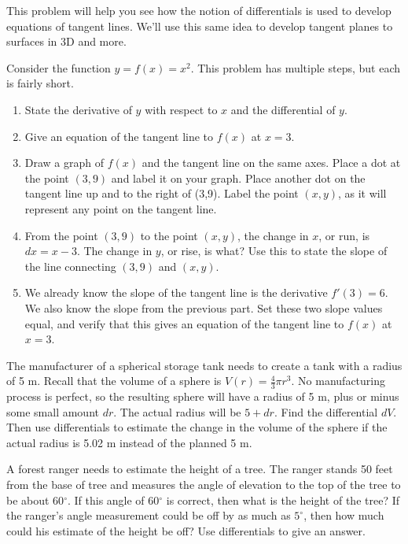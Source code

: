 This problem will help you see how the notion of differentials is used to develop equations of tangent lines. We'll use this same idea to develop tangent planes to surfaces in 3D and more.
\begin{problem} \label{differentials give tangent
    lines}
Consider the function $y=f(x) = x^2$. This problem has multiple steps, but each is fairly short.
\begin{enumerate}
\item State the derivative of $y$ with respect to $x$ and the differential of $y$.  
\item Give an equation of the tangent line to $f(x)$ at $x=3$.
\item Draw a graph of $f(x)$ and the tangent line on the same axes. Place a dot at the point $(3,9)$ and label it on your graph. Place another dot on the tangent line up and to the right of (3,9). Label the point $(x,y)$, as it will represent any point on the tangent line. 
\item From the point $(3,9)$ to the point $(x,y)$, the change in $x$, or run, is $dx=x-3$. The change in $y$, or rise, is what? Use this to state the slope of the line connecting $(3,9)$ and $(x,y)$.
\item We already know the slope of the tangent line is the derivative $f'(3)=6$. We also know the slope from the previous part. Set these two slope values equal, and verify that this gives an equation of the tangent line to $f(x)$ at $x=3$. 
\end{enumerate}
\end{problem}
 
\begin{problem}  \label{diff-sphere}
The manufacturer of a spherical storage tank needs to create a tank with a radius of 5 m. Recall that the volume of a sphere is $V(r) = \frac{4}{3}\pi r^3$. No manufacturing process is perfect, so the resulting sphere will have a radius of 5 m, plus or minus some small amount $dr$. The actual radius will be $5+dr$. Find the differential $dV$.  Then use differentials to estimate the change in the volume of the sphere if the actual radius is 5.02 m instead of the planned 5 m.    
\end{problem}
 
\begin{problem}
A forest ranger needs to estimate the height of a tree.  The ranger stands 50 feet from the base of tree and measures the angle of elevation to the top of the tree to be about 60$^\circ$. If this angle of 60$^\circ$ is correct, then what is the height of the tree? If the ranger's angle measurement could be off by as much as $5^\circ$, then how much could his estimate of the height be off? Use differentials to give an answer.
\end{problem}



